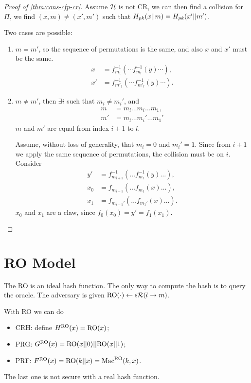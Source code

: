 \begin{proof}[Proof of \cref{thm:cons-cfp-cr}]
	Assume $\mathcal{H}$ is not \ac{CR}, we can then find a collision for $\Pi$, \ie we find $(x,m) \neq (x',m')$ such that $H_{pk}(x || m) = H_{pk} (x' || m')$.

	Two cases are possible:
	\begin{enumerate}
		\item $m = m'$, so the sequence of permutations is the same, and also $x$ and $x'$ must be the same.
			\begin{align*}
				x & = f_{m_1}^{-1}( \cdots f_{m_l}^{-1}( y) \cdots ), \\
				x' & = f_{m'_1}^{-1}( \cdots f_{m'_l}^{-1}( y) \cdots ).
			\end{align*}
		\item $m \neq m'$, then $\exists i$ such that $m_i \neq m_i'$, and
			\begin{align*}
				m & = m_l \dots m_i \dots m_1, \\
				m' & = m_l \dots m_i' \dots m_1'
			\end{align*}
			\ie $m$ and $m'$ are equal from index $i+1$ to $l$.

			Assume, without loss of generality, that $m_i = 0$ and $m_i' = 1$.
			Since from $i+1$ we apply the same sequence of permutations, the collision must be on $i$.
			Consider
			\begin{align*}
				y' & = f_{m_{i+1}}^{-1}( \dots f_{m_l}^{-1} (y) \dots), \\
				x_0 & = f_{m_{i-1}} (\dots f_{m_1} (x) \dots ), \\
				x_1 & = f_{m_{i-1}'} (\dots f_{m_1'} (x) \dots ).
			\end{align*}
			$x_0$ and $x_1$ are a claw, since $f_0(x_0) = y' = f_1(x_1)$. \qedhere
	\end{enumerate}
\end{proof}

\section{\acl{RO} Model}

The \ac{RO} is an ideal hash function.
The only way to compute the hash is to query the oracle.
The adversary is given $\mathrm{RO}(\cdot) \leftarrow {\scriptstyle \$} {\mathcal{R}(l \to m)}$.

With \ac{RO} we can do
\begin{itemize}
	\item \ac{CRH}: define $H^{\mathrm{RO}}(x) = \mathrm{RO}(x)$;
	\item \ac{PRG}: $G^{\mathrm{RO}}(x) = \mathrm{RO}(x || 0) || \mathrm{RO}(x || 1)$;
	\item \ac{PRF}: $F^{\mathrm{RO}}(x) = \mathrm{RO}(k || x) = \mathrm{Mac}^{\mathrm{RO}}(k, x)$.
\end{itemize}
The last one is not secure with a real hash function.


